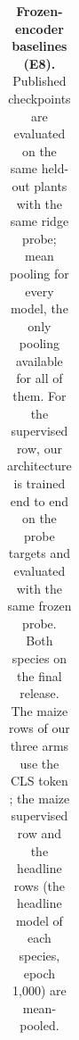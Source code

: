 \begin{table}[t]
\begin{tabular}{l ccc cc c cccc}
    \bottomrule
  \end{tabular}
  \caption{\textbf{Frozen-encoder baselines (E8).} Published checkpoints are
  evaluated on the same held-out plants with the same ridge probe; mean pooling
  for every model, the only pooling available for all of them. For the
  supervised row, our architecture is trained end to end on the probe targets
  and evaluated with the same frozen probe. Both species on the final release. The maize rows of our three arms
  use the CLS token ; the maize supervised row and the
  headline rows (the headline model of each species, epoch 1{,}000) are mean-pooled.}
  \label{tab:e8}
\end{table}

